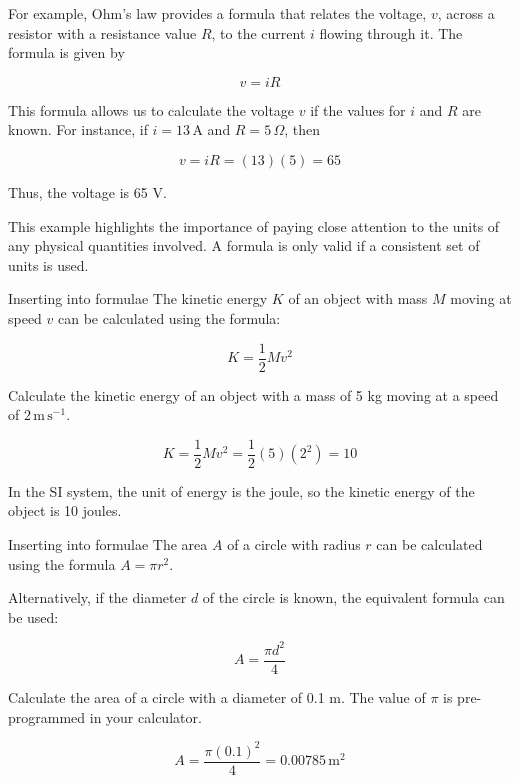 For example, Ohm’s law provides a formula that relates the voltage, \(v\), across a resistor with a resistance value \(R\), to the current \(i\) flowing through it. The formula is given by

\[
v = iR
\]

This formula allows us to calculate the voltage \(v\) if the values for \(i\) and \(R\) are known. For instance, if \(i = 13 \, \text{A}\) and \(R = 5 \, \Omega\), then

\[
v = iR = (13)(5) = 65
\]

Thus, the voltage is 65 V.

This example highlights the importance of paying close attention to the units of any physical quantities involved. A formula is only valid if a consistent set of units is used.

\begin{example} Inserting into formulae \newline
The kinetic energy \(K\) of an object with mass \(M\) moving at speed \(v\) can be calculated using the formula:

\[
K = \frac{1}{2}Mv^2
\]

Calculate the kinetic energy of an object with a mass of 5 kg moving at a speed of \(2 \, \text{m} \, \text{s}^{-1}\).

\begin{solution}
\[
K = \frac{1}{2}Mv^2 = \frac{1}{2}(5)(2^2) = 10
\] 

\end{solution}

In the SI system, the unit of energy is the joule, so the kinetic energy of the object is 10 joules.
\end{example}

\begin{example} Inserting into formulae \newline
The area \(A\) of a circle with radius \(r\) can be calculated using the formula \(A = \pi r^2\).

Alternatively, if the diameter \(d\) of the circle is known, the equivalent formula can be used:

\[
A = \frac{\pi d^2}{4}
\]

Calculate the area of a circle with a diameter of 0.1 m. The value of \(\pi\) is pre-programmed in your calculator.

\begin{solution}
    \[
A = \frac{\pi (0.1)^2}{4} = 0.00785 \, \text{m}^2
\]

\end{solution}


\end{example}

